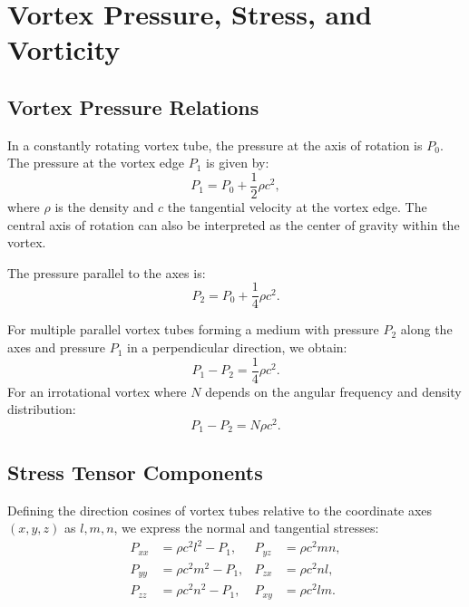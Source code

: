 

    \section{Vortex Pressure, Stress, and Vorticity}

    \subsection*{Vortex Pressure Relations}
    In a constantly rotating vortex tube, the pressure at the axis of rotation is $P_0$. The pressure at the vortex edge $P_1$ is given by:
    \begin{equation}
        P_1 = P_0 + \frac{1}{2} \rho c^2,
    \end{equation}
    where $\rho$ is the density and $c$ the tangential velocity at the vortex edge. The central axis of rotation can also be interpreted as the center of gravity within the vortex.

    The pressure parallel to the axes is:
    \begin{equation}
        P_2 = P_0 + \frac{1}{4} \rho c^2.
    \end{equation}

    For multiple parallel vortex tubes forming a medium with pressure $P_2$ along the axes and pressure $P_1$ in a perpendicular direction, we obtain:
    \begin{equation}
        P_1 - P_2 = \frac{1}{4} \rho c^2.
    \end{equation}
    For an irrotational vortex where $N$ depends on the angular frequency and density distribution:
    \begin{equation}
        P_1 - P_2 = N \rho c^2.
    \end{equation}

    \subsection*{Stress Tensor Components}
    Defining the direction cosines of vortex tubes relative to the coordinate axes $(x, y, z)$ as $l, m, n$, we express the normal and tangential stresses:
    \begin{align}
        P_{xx} &= \rho c^2 l^2 - P_1, & P_{yz} &= \rho c^2 m n, \\
        P_{yy} &= \rho c^2 m^2 - P_1, & P_{zx} &= \rho c^2 n l, \\
        P_{zz} &= \rho c^2 n^2 - P_1, & P_{xy} &= \rho c^2 l m.
    \end{align}

